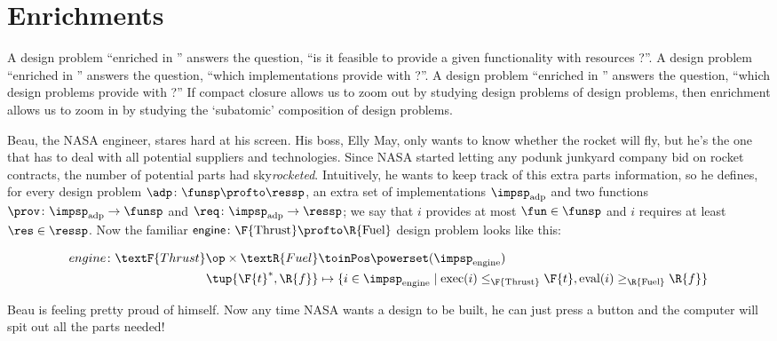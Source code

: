 

\section{Enrichments}
\label{sec:enriched}


A design problem ``enriched in \Bool'' answers the question, ``is it feasible to provide a given functionality \fun with resources \res?''. A design problem ``enriched in \Set'' answers the question, ``which implementations provide \fun with \res?''. A design problem ``enriched in \DP'' answers the question, ``which design problems provide \fun with \res?'' If compact closure allows us to zoom out by studying design problems of design problems, then enrichment allows us to zoom in by studying the `subatomic' composition of design problems.

\begin{example}
  \label{ex:dpi_example}
  Beau, the NASA engineer, stares hard at his screen. His boss, Elly May, only wants to know whether the rocket will fly, but he's the one that has to deal with all potential suppliers and technologies. Since NASA started letting any podunk junkyard company bid on rocket contracts, the number of potential parts had sky\emph{rocketed}. Intuitively, he wants to keep track of this extra parts information, so he defines, for every design problem $\adp \colon \funsp \profto \ressp$, an extra set of implementations $\impsp_\text{adp}$ and two functions $\prov\colon \impsp_\text{adp} \to \funsp$ and  $\req\colon \impsp_\text{adp} \to \ressp$; we say that $i$ provides at most $\fun \in \funsp$ and $i$ requires at least $\res \in \ressp$. Now the familiar $\mathsf{engine} \colon \F{\text{Thrust}} \profto \R{\text{Fuel}}$ design problem looks like this:
  \begin{widepar}
  \begin{equation*}
    \begin{aligned}
      engine \colon \textF{Thrust}\op \times \textR{Fuel} &\toinPos \powerset(\impsp_\text{engine}) \\
      \tup{\F{t}^*,\R{f}} &\mapsto \{ i \in \impsp_\text{engine} \mid \text{exec}(i) \leq_\F{\text{Thrust}} \F{t}, \text{eval}(i) \geq_\R{\text{Fuel}} \R{f} \}
    \end{aligned}
  \end{equation*}
  \end{widepar}
  Beau is feeling pretty proud of himself. Now any time NASA wants a design to be built, he can just press a button and the computer will spit out all the parts needed!
\end{example}


